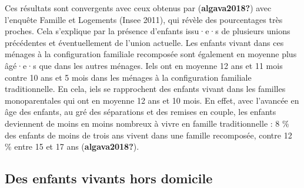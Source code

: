 \documentclass[
  12pt,
]{book}
\begin{document}
Ces résultats sont convergents avec ceux obtenus par
(\textbf{algava2018?}) avec l'enquête Famille et Logements (Insee 2011),
qui révèle des pourcentages très proches. Cela s'explique par la
présence d'enfants issu·e·s de plusieurs unions précédentes et
éventuellement de l'union actuelle. Les enfants vivant dans ces ménages
à la configuration familiale recomposée sont également en moyenne plus
âgé·e·s que dans les autres ménages. Iels ont en moyenne 12 ans et 11
mois contre 10 ans et 5 mois dans les ménages à la configuration
familiale traditionnelle. En cela, iels se rapprochent des enfants
vivant dans les familles monoparentales qui ont en moyenne 12 ans et 10
mois. En effet, avec l'avancée en âge des enfants, au gré des
séparations et des remises en couple, les enfants deviennent de moins en
moins nombreux à vivre en famille traditionnelle : 8 \% des enfants de
moins de trois ans vivent dans une famille recomposée, contre 12 \%
entre 15 et 17 ans (\textbf{algava2018?}).

\subsection{Des enfants vivants hors
domicile}\label{des-enfants-vivants-hors-domicile}
\end{document}
